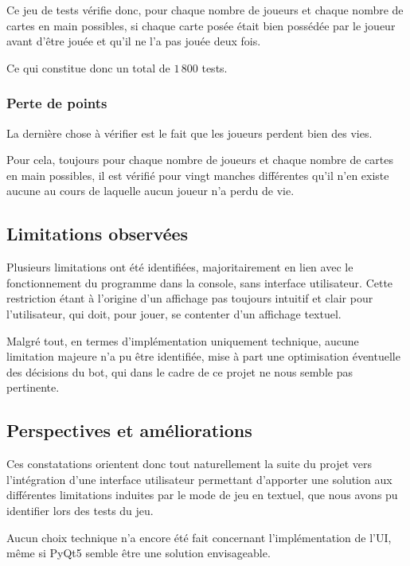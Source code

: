          Ce jeu de tests vérifie donc, pour chaque nombre de joueurs et chaque nombre de cartes en main possibles, si chaque carte posée était bien possédée par le joueur avant d'être jouée et qu'il ne l'a pas jouée deux fois.

         Ce qui constitue donc un total de $1\,800$ tests.

      \subsubsection{Perte de points}
         La dernière chose à vérifier est le fait que les joueurs perdent bien des vies.

         Pour cela, toujours pour chaque nombre de joueurs et chaque nombre de cartes en main possibles, il est vérifié pour vingt manches différentes qu'il n'en existe aucune au cours de laquelle aucun joueur n'a perdu de vie.

   \subsection{Limitations observées}\label{subsec:limitations-observées}
      Plusieurs limitations ont été identifiées, majoritairement en lien avec le fonctionnement du programme dans la console, sans interface utilisateur.
      Cette restriction étant à l'origine d'un affichage pas toujours intuitif et clair pour l'utilisateur, qui doit, pour jouer, se contenter d'un affichage textuel.

      Malgré tout, en termes d'implémentation uniquement technique, aucune limitation majeure n'a pu être identifiée, mise à part une optimisation éventuelle des décisions du bot, qui dans le cadre de ce projet ne nous semble pas pertinente.

   
   \subsection{Perspectives et améliorations}\label{subsec:perspectives-et-améliorations}
      Ces constatations orientent donc tout naturellement la suite du projet vers l'intégration d'une interface utilisateur permettant d'apporter une solution aux différentes limitations induites par le mode de jeu en textuel, que nous avons pu identifier lors des tests du jeu.

      Aucun choix technique n'a encore été fait concernant l'implémentation de l'UI, même si PyQt5 semble être une solution envisageable.

